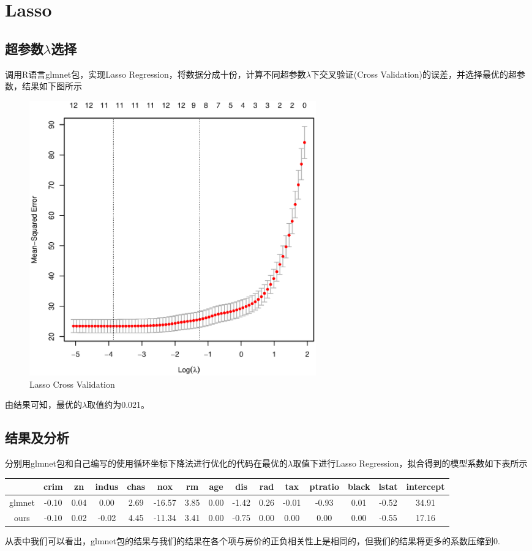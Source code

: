 \section{Lasso}
    \subsection{超参数$\lambda$选择}
    调用R语言glmnet包，实现Lasso Regression，将数据分成十份，计算不同超参数$\lambda$下交叉验证(Cross Validation)的误差，并选择最优的超参数，结果如下图所示
    \begin{figure}[H]
        \centering
        \includegraphics[width=0.6\textwidth]{lassocv.eps}
        \caption{Lasso Cross Validation}
    \end{figure}
    由结果可知，最优的$\lambda$取值约为0.021。
    \subsection{结果及分析}
    分别用glmnet包和自己编写的使用循环坐标下降法进行优化的代码在最优的$\lambda$取值下进行Lasso Regression，拟合得到的模型系数如下表所示
    \begin{table}[]
        \begin{tabular}{|c|c|c|c|c|c|c|c|c|c|c|c|c|c|c|}
        \hline
               & crim  & zn   & indus & chas & nox    & rm   & age  & dis   & rad  & tax   & ptratio & black & lstat & intercept \\ \hline
        glmnet & -0.10 & 0.04 & 0.00  & 2.69 & -16.57 & 3.85 & 0.00 & -1.42 & 0.26 & -0.01 & -0.93   & 0.01  & -0.52 & 34.91     \\ \hline
        ours   & -0.10 & 0.02 & -0.02 & 4.45 & -11.34 & 3.41 & 0.00 & -0.75 & 0.00 & 0.00  & 0.00    & 0.00  & -0.55 & 17.16     \\ \hline
        \end{tabular}
    \end{table}
    从表中我们可以看出，glmnet包的结果与我们的结果在各个项与房价的正负相关性上是相同的，但我们的结果将更多的系数压缩到0.
    
